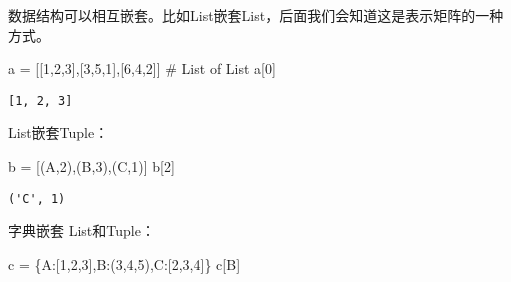 \documentclass[
  letterpaper,
  DIV=11,
  numbers=noendperiod]{scrreprt}
\newenvironment{Shaded}{\begin{snugshade}}{\end{snugshade}}
\newcommand{\CommentTok}[1]{\textcolor[rgb]{0.37,0.37,0.37}{#1}}
\newcommand{\DecValTok}[1]{\textcolor[rgb]{0.68,0.00,0.00}{#1}}
\newcommand{\NormalTok}[1]{\textcolor[rgb]{0.00,0.23,0.31}{#1}}
\newcommand{\OperatorTok}[1]{\textcolor[rgb]{0.37,0.37,0.37}{#1}}
\newcommand{\StringTok}[1]{\textcolor[rgb]{0.13,0.47,0.30}{#1}}
\begin{document}
数据结构可以相互嵌套。比如List嵌套List，后面我们会知道这是表示矩阵的一种方式。

\begin{Shaded}
\begin{Highlighting}[]
\NormalTok{a }\OperatorTok{=}\NormalTok{ [[}\DecValTok{1}\NormalTok{,}\DecValTok{2}\NormalTok{,}\DecValTok{3}\NormalTok{],[}\DecValTok{3}\NormalTok{,}\DecValTok{5}\NormalTok{,}\DecValTok{1}\NormalTok{],[}\DecValTok{6}\NormalTok{,}\DecValTok{4}\NormalTok{,}\DecValTok{2}\NormalTok{]] }\CommentTok{\# List of List}
\NormalTok{a[}\DecValTok{0}\NormalTok{] }
\end{Highlighting}
\end{Shaded}

\begin{verbatim}
[1, 2, 3]
\end{verbatim}

List嵌套Tuple：

\begin{Shaded}
\begin{Highlighting}[]
\NormalTok{b }\OperatorTok{=}\NormalTok{ [(}\StringTok{\textquotesingle{}A\textquotesingle{}}\NormalTok{,}\DecValTok{2}\NormalTok{),(}\StringTok{\textquotesingle{}B\textquotesingle{}}\NormalTok{,}\DecValTok{3}\NormalTok{),(}\StringTok{\textquotesingle{}C\textquotesingle{}}\NormalTok{,}\DecValTok{1}\NormalTok{)]}
\NormalTok{b[}\DecValTok{2}\NormalTok{]}
\end{Highlighting}
\end{Shaded}

\begin{verbatim}
('C', 1)
\end{verbatim}

字典嵌套 List和Tuple：

\begin{Shaded}
\begin{Highlighting}[]
\NormalTok{c }\OperatorTok{=}\NormalTok{ \{}\StringTok{\textquotesingle{}A\textquotesingle{}}\NormalTok{:[}\DecValTok{1}\NormalTok{,}\DecValTok{2}\NormalTok{,}\DecValTok{3}\NormalTok{],}\StringTok{\textquotesingle{}B\textquotesingle{}}\NormalTok{:(}\DecValTok{3}\NormalTok{,}\DecValTok{4}\NormalTok{,}\DecValTok{5}\NormalTok{),}\StringTok{\textquotesingle{}C\textquotesingle{}}\NormalTok{:[}\DecValTok{2}\NormalTok{,}\DecValTok{3}\NormalTok{,}\DecValTok{4}\NormalTok{]\}}
\NormalTok{c[}\StringTok{\textquotesingle{}B\textquotesingle{}}\NormalTok{]}
\end{Highlighting}
\end{Shaded}
\end{document}
